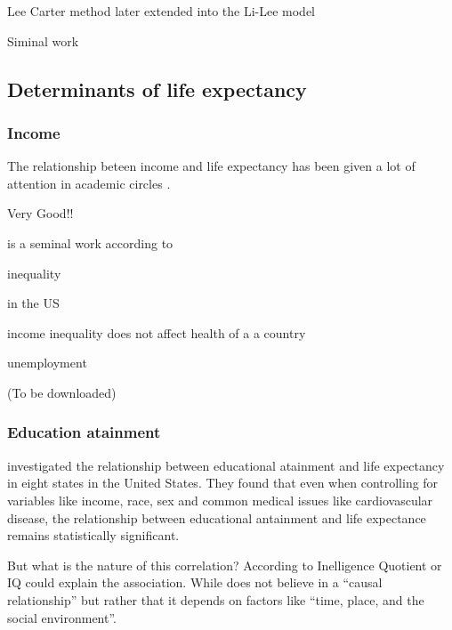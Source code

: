 \documentclass[10pt,a4paper]{article}
\begin{document}
Lee Carter method \cite{Shang2011} later extended into the Li-Lee model

Siminal work \cite{Lee1992}

\cite{Bongaarts2005}

\subsection{Determinants of life expectancy}



\subsubsection{Income}

The relationship beteen income and life expectancy has been given a lot of attention in academic circles \citep{Preston1975, Hu2015, Chetty2016, Oeppen2019}. 











\cite{Kalwij2014}

\cite{Oeppen2019} Very Good!!

\cite{Preston1975} is a seminal work according to \cite{Oeppen2019}

inequality \cite{Hu2015}

\cite{Chetty2016} in the US

income inequality does not affect health of a a country \cite{JasonBeckfield2004}

unemployment \cite{Bonamore2015} \cite{Roelfs2011} \cite{Roelfs2015} 

\cite{Tarkiainen2012} (To be downloaded)

\subsubsection{Education atainment}


\cite{Kaplan2015} investigated the relationship between educational atainment and life expectancy in eight states in the United States. They found that even when controlling for variables like income, race, sex and common medical issues like cardiovascular disease, the relationship between educational antainment and life expectance remains statistically significant.

But what is the nature of this correlation? According to \cite{Deary2004} Inelligence Quotient or IQ could explain the association. While \cite{Hayward2015} does not believe in a ``causal relationship'' but rather that it depends on factors like ``time, place, and the social environment''.
\end{document}
